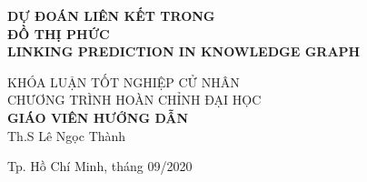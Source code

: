 \begin{titlepage}
\begin{center}

{ \Large \bfseries DỰ ĐOÁN LIÊN KẾT TRONG\\ĐỒ THỊ PHỨC\\LINKING PREDICTION IN KNOWLEDGE GRAPH\\[2cm] } 


\large KHÓA LUẬN TỐT NGHIỆP CỬ NHÂN\\
\large CHƯƠNG TRÌNH HOÀN CHỈNH ĐẠI HỌC\\[2cm]

\textbf{GIÁO VIÊN HƯỚNG DẪN}\\
Th.S Lê Ngọc Thành\\


\vfill
Tp. Hồ Chí Minh, tháng 09/2020

\end{center}

\end{titlepage}
